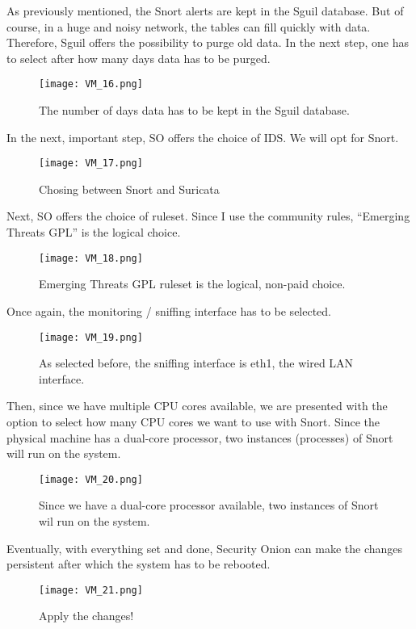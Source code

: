\clearpage
As previously mentioned, the Snort alerts are kept in the Sguil database. But of course, in a huge and noisy network, the tables can fill quickly with data. Therefore, Sguil offers the possibility to purge old data. In the next step, one has to select after how many days data has to be purged.
\begin{figure}[h]
    \centering
    \texttt{[image: VM\_16.png]}
    \caption{The number of days data has to be kept in the Sguil database.}
\end{figure}

In the next, important step, SO offers the choice of IDS. We will opt for Snort.
\begin{figure}[h]
    \centering
    \texttt{[image: VM\_17.png]}
    \caption{Chosing between Snort and Suricata}
\end{figure}

\clearpage
Next, SO offers the choice of ruleset. Since I use the community rules, ``Emerging Threats GPL'' is the logical choice.
\begin{figure}[h]
    \centering
    \texttt{[image: VM\_18.png]}
    \caption{Emerging Threats GPL ruleset is the logical, non-paid choice.}
\end{figure}

Once again, the monitoring / sniffing interface has to be selected.
\begin{figure}[h]
    \centering
    \texttt{[image: VM\_19.png]}
    \caption{As selected before, the sniffing interface is eth1, the wired LAN interface.}
\end{figure}

\clearpage
Then, since we have multiple CPU cores available, we are presented with the option to select how many CPU cores we want to use with Snort. Since the physical machine has a dual-core processor, two instances (processes) of Snort will run on the system.
\begin{figure}[h]
    \centering
    \texttt{[image: VM\_20.png]}
    \caption{Since we have a dual-core processor available, two instances of Snort wil run on the system.}
\end{figure}

Eventually, with everything set and done, Security Onion can make the changes persistent after which the system has to be rebooted.
\begin{figure}[h]
    \centering
    \texttt{[image: VM\_21.png]}
    \caption{Apply the changes!}
\end{figure}

